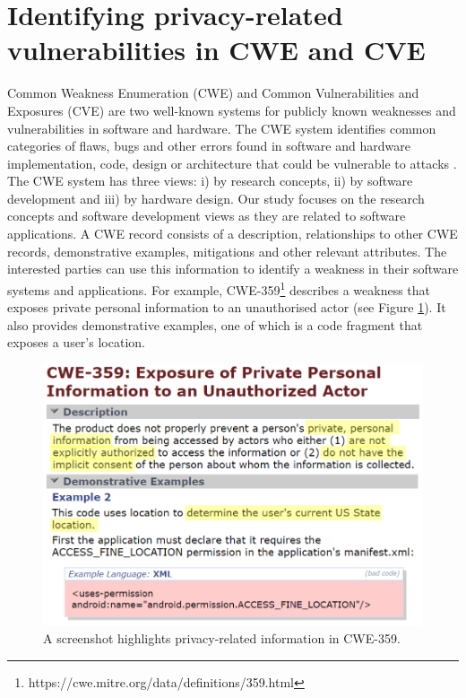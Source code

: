 \section{Identifying privacy-related vulnerabilities in CWE and CVE} \label{sec:identifying-privacy-vul}

Common Weakness Enumeration (CWE) and Common Vulnerabilities and Exposures (CVE) are two well-known systems for publicly known weaknesses and vulnerabilities in software and hardware. %
The CWE system identifies common categories of flaws, bugs and other errors found in software and hardware implementation, code, design or architecture that could be vulnerable to attacks \cite{CWE}. The CWE system has three views: i) by research concepts, ii) by software development and iii) by hardware design. Our study focuses on the research concepts and software development views as they are related to software applications. A CWE record consists of a description, relationships to other CWE records, demonstrative examples, mitigations and other relevant attributes. The interested parties can use this information to identify a weakness in their software systems and applications. For example, CWE-359\footnote{https://cwe.mitre.org/data/definitions/359.html} describes a weakness that exposes private personal information to an unauthorised actor (see Figure \ref{fig:cwe-359}). It also provides demonstrative examples, one of which is a code fragment that exposes a user's location. %

\begin{figure}[ht]
	\centering
	\includegraphics[width=1.0\linewidth]{figures/cwe-359.png}
	\caption{A screenshot highlights privacy-related information in CWE-359.}
	\label{fig:cwe-359}
\end{figure}

